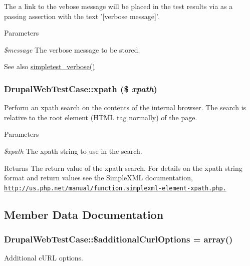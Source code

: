 The a link to the vebose message will be placed in the test results via as a passing assertion with the text '\mbox{[}verbose message\mbox{]}'.


\begin{DoxyParams}{Parameters}
\item[{\em \$message}]The verbose message to be stored. \end{DoxyParams}
\begin{DoxySeeAlso}{See also}
\hyperlink{drupal__web__test__case_8php_ac8ef212d48360d65d8a3697e709565d7}{simpletest\_\-verbose()} 
\end{DoxySeeAlso}
\hypertarget{class_drupal_web_test_case_a6442bac68174cd9c13277515573728e9}{
\subsubsection[{xpath}]{\setlength{\rightskip}{0pt plus 5cm}DrupalWebTestCase::xpath (\$ {\em xpath})}}
\label{class_drupal_web_test_case_a6442bac68174cd9c13277515573728e9}
Perform an xpath search on the contents of the internal browser. The search is relative to the root element (HTML tag normally) of the page.


\begin{DoxyParams}{Parameters}
\item[{\em \$xpath}]The xpath string to use in the search. \end{DoxyParams}
\begin{DoxyReturn}{Returns}
The return value of the xpath search. For details on the xpath string format and return values see the SimpleXML documentation, \href{http://us.php.net/manual/function.simplexml-element-xpath.php.}{\tt http://us.php.net/manual/function.simplexml-\/element-\/xpath.php.} 
\end{DoxyReturn}


\subsection{Member Data Documentation}
\hypertarget{class_drupal_web_test_case_a8e4e1c5a9b63d403d10ad2f6a2f06aaa}{
\subsubsection[{\$additionalCurlOptions}]{\setlength{\rightskip}{0pt plus 5cm}DrupalWebTestCase::\$additionalCurlOptions = array()}}
\label{class_drupal_web_test_case_a8e4e1c5a9b63d403d10ad2f6a2f06aaa}
Additional cURL options.


